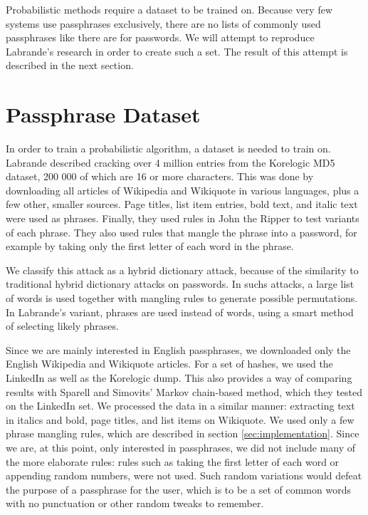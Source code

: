 \documentclass{article}
\begin{document}
Probabilistic methods require a dataset to be trained on. Because very few
systems use passphrases exclusively, there are no lists of commonly used
passphrases like there are for passwords. We will attempt to reproduce
Labrande's research\cite{crackmeimfamous} in order to create such a set. The
result of this attempt is described in the next section.


\section{Passphrase Dataset}\label{sec:dataset}

In order to train a probabilistic algorithm, a dataset is needed to train on.
Labrande described cracking over 4 million entries from the
Korelogic\cite{korelogic} MD5 dataset, 200 000 of which are 16 or more
characters. This was done by downloading all articles of Wikipedia and
Wikiquote in various languages, plus a few other, smaller sources. Page titles,
list item entries, bold text, and italic text were used as phrases. Finally,
they used rules in John the Ripper to test variants of each phrase. They also
used rules that mangle the phrase into a password, for example by taking only
the first letter of each word in the phrase.

We classify this attack as a hybrid dictionary attack, because of the
similarity to traditional hybrid dictionary attacks on passwords. In suchs
attacks, a large list of words is used together with mangling rules to generate
possible permutations. In Labrande's variant, phrases are used instead of
words, using a smart method of selecting likely phrases.

Since we are mainly interested in English passphrases, we downloaded only the
English Wikipedia and Wikiquote articles. For a set of hashes, we used the
LinkedIn as well as the Korelogic dump. This also provides a way of comparing
results with Sparell and Simovits'\cite{sparell-simovits} Markov chain-based
method, which they tested on the LinkedIn set. We processed the data in a
similar manner: extracting text in italics and bold, page titles, and list
items on Wikiquote. We used only a few phrase mangling rules, which are
described in section \ref{sec:implementation}. Since we are, at this point,
only interested in passphrases, we did not include many of the more elaborate
rules: rules such as taking the first letter of each word or appending random
numbers, were not used. Such random variations would defeat the purpose of a
passphrase for the user, which is to be a set of common words with no
punctuation or other random tweaks to remember.
\end{document}
